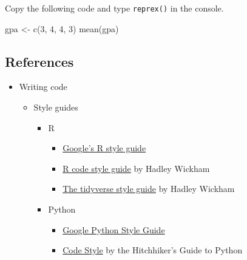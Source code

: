 \documentclass[
]{book}
\newenvironment{Shaded}{\begin{snugshade}}{\end{snugshade}}
\newcommand{\DecValTok}[1]{\textcolor[rgb]{0.00,0.00,0.81}{#1}}
\newcommand{\FunctionTok}[1]{\textcolor[rgb]{0.00,0.00,0.00}{#1}}
\newcommand{\NormalTok}[1]{#1}
\newcommand{\OtherTok}[1]{\textcolor[rgb]{0.56,0.35,0.01}{#1}}
\providecommand{\tightlist}{%
  \setlength{\itemsep}{0pt}\setlength{\parskip}{0pt}}
\begin{document}
Copy the following code and type \texttt{reprex()} in the console.

\begin{Shaded}
\begin{Highlighting}[]
\NormalTok{gpa }\OtherTok{\textless{}{-}} \FunctionTok{c}\NormalTok{(}\DecValTok{3}\NormalTok{, }\DecValTok{4}\NormalTok{, }\DecValTok{4}\NormalTok{, }\DecValTok{3}\NormalTok{)}
\FunctionTok{mean}\NormalTok{(gpa)}
\end{Highlighting}
\end{Shaded}

\hypertarget{references-3}{%
\subsection{References}\label{references-3}}

\begin{itemize}
\item
  Writing code

  \begin{itemize}
  \tightlist
  \item
    Style guides

    \begin{itemize}
    \tightlist
    \item
      R

      \begin{itemize}
      \tightlist
      \item
        \href{https://google.GitHub.io/styleguide/Rguide.xml}{Google's R style guide}
      \item
        \href{http://r-pkgs.had.co.nz/r.html}{R code style guide} by Hadley Wickham
      \item
        \href{http://style.tidyverse.org/}{The tidyverse style guide} by Hadley Wickham
      \end{itemize}
    \item
      Python

      \begin{itemize}
      \tightlist
      \item
        \href{https://GitHub.com/google/styleguide/blob/gh-pages/pyguide.md}{Google Python Style Guide}
      \item
        \href{https://docs.python-guide.org/writing/style/\#zen-of-python}{Code Style} by the Hitchhiker's Guide to Python
      \end{itemize}
    \end{itemize}
  \end{itemize}
\end{itemize}
\end{document}
